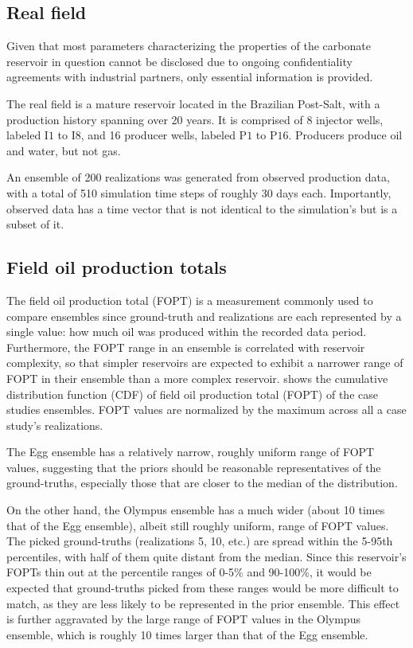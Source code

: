 \subsection{Real field}
Given that most parameters characterizing the properties of the carbonate reservoir in question 
cannot be disclosed due to ongoing confidentiality agreements with industrial partners, 
only essential information is provided.

The real field is a mature reservoir located in the Brazilian Post-Salt,
with a production history spanning over 20 years.
It is comprised of 8 injector wells, labeled I$1$ to I$8$, and 16 producer wells, labeled P$1$ to P$16$.
Producers produce oil and water, but not gas.

An ensemble of 200 realizations was generated from observed production data, 
with a total of 510 simulation time steps of roughly 30 days each.
Importantly, observed data has a time vector that is not identical to the simulation's but is a subset of it.

\subsection{Field oil production totals}
\label{subsec:fopts}
The field oil production total (FOPT) 
is a measurement commonly used to compare ensembles since ground-truth and realizations are each represented by a single value:
how much oil was produced within the recorded data period. 
%
Furthermore, the FOPT range in an ensemble is correlated with reservoir complexity,
so that simpler reservoirs are expected to exhibit a narrower range of FOPT in their ensemble 
than a more complex reservoir. 
%
 shows the cumulative distribution function (CDF) of field oil production total (FOPT) of the case studies ensembles.
FOPT values are normalized by the maximum across all a case study's realizations.

The Egg ensemble has a relatively narrow, roughly uniform range of FOPT values,
suggesting that the priors should be reasonable representatives of the ground-truths, 
especially those that are closer to the median of the distribution. 

On the other hand,
the Olympus ensemble has a much wider (about 10 times that of the Egg ensemble), 
albeit still roughly uniform, range of FOPT values.
%
The picked ground-truths (realizations 5, 10, etc.) are spread within the 5-95th percentiles, 
with half of them quite distant from the median.
Since this reservoir's FOPTs thin out at the percentile ranges of 0-5\% and 90-100\%,
it would be expected that ground-truths picked from these ranges would be more difficult to match, 
as they are less likely to be represented in the prior ensemble.
This effect is further aggravated by the large range of FOPT values in the Olympus ensemble, which is roughly 10 times larger than that of the Egg ensemble.

